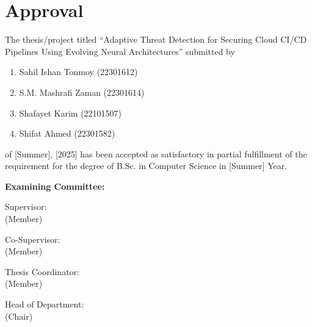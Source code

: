 \section*{Approval}

The thesis/project titled “Adaptive Threat Detection for Securing Cloud CI/CD Pipelines Using Evolving Neural Architectures” submitted by 
\begin{enumerate}
  \item Sahil Ishan Tonmoy (22301612)
  \item S.M. Mashrafi Zaman (22301614)
  \item Shafayet Karim (22101507) 
  \item Shifat Ahmed (22301582)
\end{enumerate}

of [Summer], [2025] has been accepted as satisfactory in partial fulfillment of the requirement for the degree of B.Sc. in Computer Science in [Summer] Year. 

\vspace{0.5cm}
\textbf{Examining Committee:}

\vspace{1cm}

Supervisor:\\
(Member)
\begin{center}
    \hspace{7cm}  \hspace{1cm} 
\end{center}

Co-Supervisor:\\
(Member)
\begin{center}
    \hspace{7cm}  \hspace{1cm} 
\end{center}


Thesis Coordinator:\\
(Member)
\begin{center}
    \hspace{7cm}  \hspace{1cm} 
\end{center}

Head of Department:\\
(Chair)
\begin{center}
    \hspace{7cm}  \hspace{1cm} 
\end{center}

\pagebreak